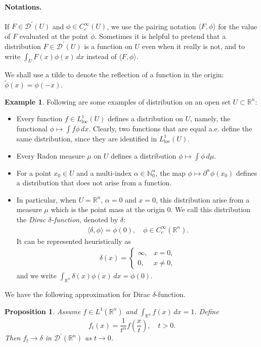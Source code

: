 \documentclass{article}
\numberwithin{equation}{section}
\newcommand{\bbN}{\mathbb{N}}
\newcommand{\bbR}{\mathbb{R}}
\renewcommand{\cal}{\mathcal}
\newcommand{\loc}{\mathrm{loc}}
\newcommand{\wt}{\widetilde}
\theoremstyle{plain}
\newtheorem{proposition}[theorem]{Proposition}
\theoremstyle{definition}
\newtheorem{example}[theorem]{Example}
\begin{document}
\paragraph{Notations.} If $F\in\cal{D}^\prime(U)$ and $\phi\in C_c^\infty(U)$, we use the pairing notation $\langle F,\phi\rangle$ for the value of $F$ evaluated at the point $\phi$. Sometimes it is helpful to pretend that a distribution $F\in\cal{D}^\prime(U)$ is a function on $U$ even when it really is not, and to write $\int_U F(x)\phi(x)\,dx$ instead of $\langle F,\phi\rangle$.

We shall use a tilde to denote the reflection of a function in the origin: $\wt{\phi}(x)=\phi(-x)$.
\begin{example} Following are some examples of distribution on an open set $U\subset\bbR^n$:
\begin{itemize}
	\item Every function $f\in L^1_\loc(U)$ defines a distribution on $U$, namely, the functional $\phi\mapsto\int f\phi\,dx$. Clearly, two functions that are equal a.e. define the same distribution, since they are identified in $L^1_\loc(U)$.
	\item Every Radon measure $\mu$ on $U$ defines a distribution $\phi\mapsto\int\phi\,d\mu$.
	\item For a point $x_0\in U$ and a multi-index $\alpha\in\bbN_0^n$, the map $\phi\mapsto\partial^\alpha\phi(x_0)$ defines a distribution that does not arise from a function. 
	\item In particular, when $U=\bbR^n$, $\alpha=0$ and $x=0$, this distribution arise from a measure $\mu$ which is the point mass at the origin $0$. We call this distribution the \textit{Dirac $\delta$-function}, denoted by $\delta$:
	\begin{align*}
		\langle\delta,\phi\rangle=\phi(0),\quad\phi\in C_c^\infty(\bbR^n).
	\end{align*}
    It can be represented heuristically as
    \begin{align*}
    	\delta(x)=\begin{cases}
    		\infty, &x=0,\\
    		0, &x\neq 0,
    	\end{cases}
    \end{align*}
    and we write $\int_{\bbR^n}\delta(x)\phi(x)\,dx=\phi(0)$.
\end{itemize}
\end{example}
We have the following approximation for Dirac $\delta$-function.
\begin{proposition}
Assume $f\in L^1(\bbR^n)$ and $\int_{\bbR^n}f(x)\,dx=1$. Define $$f_t(x)=\frac{1}{t^n}f\left(\frac{x}{t}\right),\quad t>0.$$
Then $f_t\to \delta$ in $\cal{D}^\prime(\bbR^n)$ as $t\to 0$.
\end{proposition}
\end{document}

